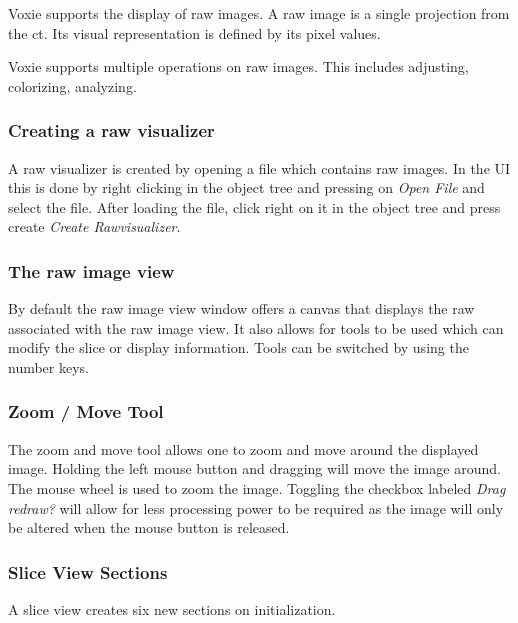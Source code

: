 Voxie supports the display of raw images. A raw image is a single projection from the ct.
Its visual representation is defined by its pixel values.

Voxie supports multiple operations on raw images. This includes adjusting, colorizing, analyzing.

\subsubsection{Creating a raw visualizer}

A raw visualizer is created by opening a file which contains raw images. In the UI this is done by right clicking in the object tree and pressing on \textit{Open File} and select the file.
After loading the file, click right on it in the object tree and press create \textit{Create Rawvisualizer}. 

\subsubsection{The raw image view}

By default the raw image view window offers a canvas that displays the raw associated with the raw image view. It also allows for tools to be used which can modify the slice or display information. Tools can be switched by using the number keys.

\subsubsection{Zoom / Move Tool}

The zoom and move tool allows one to zoom and move around the displayed image. Holding the left mouse button and dragging will move the image around. The mouse wheel is used to zoom the image. Toggling the checkbox labeled \textit{Drag redraw?} will allow for less processing power to be required as the image will only be altered when the mouse button is released.

\subsubsection{Slice View Sections}

A slice view creates six new sections on initialization.


